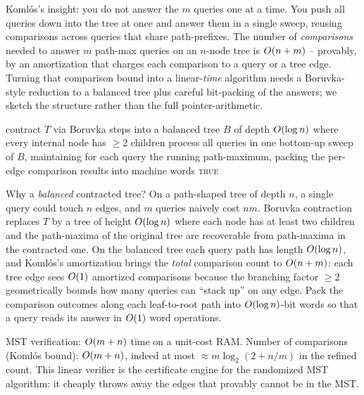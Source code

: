 \begin{intuitionbox}
Koml\'os's insight: you do not answer the $m$ queries one at a time. You push all queries down into the tree at once and answer them in a single sweep, reusing comparisons across queries that share path-prefixes. The number of \emph{comparisons} needed to answer $m$ path-max queries on an $n$-node tree is $O(n+m)$ -- provably, by an amortization that charges each comparison to a query or a tree edge. Turning that comparison bound into a linear-\emph{time} algorithm needs a Boruvka-style reduction to a balanced tree plus careful bit-packing of the answers; we sketch the structure rather than the full pointer-arithmetic.
\end{intuitionbox}

\begin{algorithm}[H]
\caption{MST-Verify (Koml\'os, structure)}
\label{ch06:verify-alg}
contract $T$ via Boruvka steps into a balanced tree $B$ of depth $O(\log n)$ where every internal node has $\ge 2$ children\;
process all queries in one bottom-up sweep of $B$, maintaining for each query the running path-maximum, packing the per-edge comparison results into machine words\;
\Return \textsc{true}\;
\end{algorithm}

\begin{whybox}
Why a \emph{balanced} contracted tree? On a path-shaped tree of depth $n$, a single query could touch $n$ edges, and $m$ queries naively cost $nm$. Boruvka contraction replaces $T$ by a tree of height $O(\log n)$ where each node has at least two children and the path-maxima of the original tree are recoverable from path-maxima in the contracted one. On the balanced tree each query path has length $O(\log n)$, and Koml\'os's amortization brings the \emph{total} comparison count to $O(n+m)$: each tree edge sees $O(1)$ amortized comparisons because the branching factor $\ge 2$ geometrically bounds how many queries can ``stack up'' on any edge. Pack the comparison outcomes along each leaf-to-root path into $O(\log n)$-bit words so that a query reads its answer in $O(1)$ word operations.
\end{whybox}

\begin{complexitybox}
MST verification: $O(m+n)$ time on a unit-cost RAM. Number of comparisons (Koml\'os bound): $O(m+n)$, indeed at most $\approx m\log_2(2 + n/m)$ in the refined count. This linear verifier is the certificate engine for the randomized MST algorithm: it cheaply throws away the edges that provably cannot be in the MST.
\end{complexitybox}

